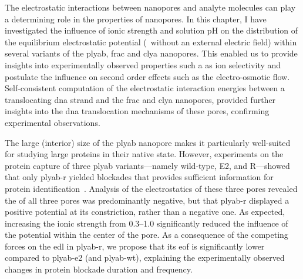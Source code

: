 The electrostatic interactions between nanopores and analyte molecules can play a determining role in the
properties of nanopores. In this chapter, I have investigated the influence of ionic strength and solution pH
on the distribution of the equilibrium electrostatic potential (\ie~without an external electric field) within
several variants of the \gls{plyab}, \gls{frac} and \gls{clya} nanopores. This enabled us to provide insights
into experimentally observed properties such a as ion selectivity and postulate the influence on second order
effects such as the electro-osmotic flow. Self-consistent computation of the electrostatic interaction
energies between a translocating \gls{dna} strand and the \gls{frac} and \gls{clya} nanopores, provided
further insights into the \gls{dna} translocation mechanisms of these pores, confirming experimental
observations.

The large (interior) size of the \gls{plyab} nanopore makes it particularly well-suited for studying large
proteins in their native state. However, experiments on the protein capture of three \gls{plyab}
variants---namely wild-type, E2, and R---showed that only \gls{plyab-r} yielded blockades that provides
sufficient information for protein identification~\cite{Huang-2020}. Analysis of the electrostatics of these
three pores revealed the \lumen{} of all three pores was predominantly negative, but that \gls{plyab-r}
displayed a positive potential at its constriction, rather than a negative one. As expected, increasing the
ionic strength from \SIrange{0.3}{1.0}{\Molar} significantly reduced the influence of the potential within the
center of the pore. As a consequence of the competing forces on the \gls{edl} in \gls{plyab-r}, we propose
that its \gls{eof} is significantly lower compared to \gls{plyab-e2} (and \gls{plyab-wt}), explaining the
experimentally observed changes in protein blockade duration and frequency.

